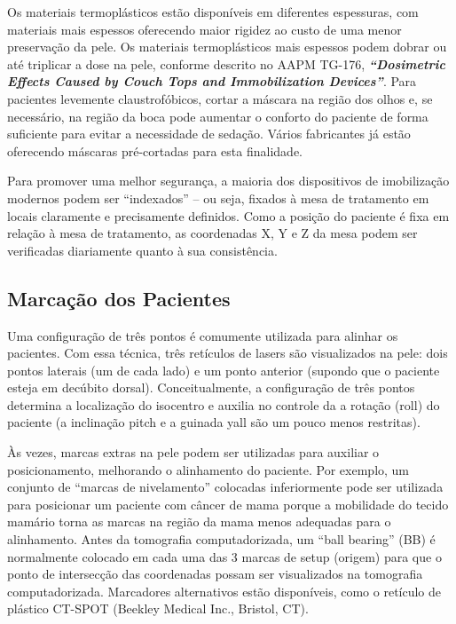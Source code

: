\documentclass[11pt,a4paper]{article}
\newcounter{exemplo}
\begin{document}
	Os materiais termoplásticos estão disponíveis em diferentes espessuras, com materiais mais espessos oferecendo maior rigidez ao custo de uma menor preservação da pele. Os materiais termoplásticos mais espessos podem dobrar ou até triplicar a dose na pele, conforme descrito no AAPM TG-176, \textit{\textbf{``Dosimetric Effects Caused by Couch Tops and Immobilization Devices''}}. Para pacientes levemente claustrofóbicos, cortar a máscara na região dos olhos e, se necessário, na região da boca pode aumentar o conforto do paciente de forma suficiente para evitar a necessidade de sedação. Vários fabricantes já estão oferecendo máscaras pré-cortadas para esta finalidade.

	Para promover uma melhor segurança, a maioria dos dispositivos de imobilização modernos podem ser “indexados” – ou seja, fixados à mesa de tratamento em locais claramente e precisamente definidos. Como a posição do paciente é fixa em relação à mesa de tratamento, as coordenadas X, Y e Z da mesa podem ser verificadas diariamente quanto à sua consistência.

\subsection*{Marcação dos Pacientes}

	Uma configuração de três pontos é comumente utilizada para alinhar os pacientes. Com essa técnica, três retículos de lasers são visualizados na pele: dois pontos laterais (um de cada lado) e um ponto anterior (supondo que o paciente esteja em decúbito dorsal). Conceitualmente, a configuração de três pontos determina a localização do isocentro e auxilia no controle da a rotação (roll) do paciente (a inclinação pitch e a guinada yall são um pouco menos restritas). 

	Às vezes, marcas extras na pele podem ser utilizadas para auxiliar o posicionamento, melhorando o alinhamento do paciente. Por exemplo, um conjunto de “marcas de nivelamento” colocadas inferiormente pode ser utilizada para posicionar um paciente com câncer de mama porque a mobilidade do tecido mamário torna as marcas na região da mama menos adequadas para o alinhamento. Antes da tomografia computadorizada, um ``ball bearing'' (BB) é normalmente colocado em cada uma das 3 marcas de setup (origem) para que o ponto de intersecção das coordenadas possam ser visualizados na tomografia computadorizada. Marcadores alternativos estão disponíveis, como o retículo de plástico CT-SPOT (Beekley Medical Inc., Bristol, CT).
	
\end{document}

